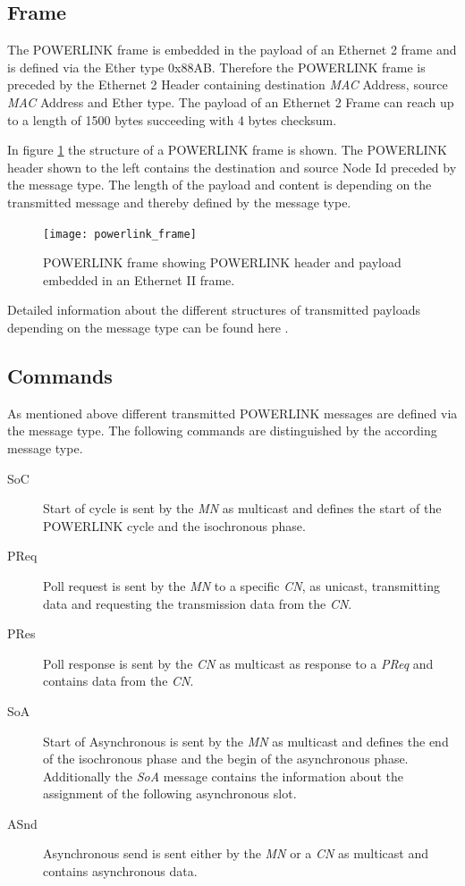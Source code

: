 \subsection{Frame}
\label{sec:oplk_powerlink_frame}
The POWERLINK frame is embedded in the payload of an Ethernet 2 frame and is defined via the Ether type 0x88AB.
Therefore the POWERLINK frame is preceded by the Ethernet 2 Header containing destination \emph{MAC} Address, source \emph{MAC} Address and Ether type.
The payload of an Ethernet 2 Frame can reach up to a length of 1500 bytes succeeding with 4 bytes checksum. \cite[section 3.2]{ethernet_ieee_2016} \cite[section 4.6.1]{epsg_epsg_2013}

In figure \ref{fig:powerlink_frame} the structure of a POWERLINK frame is shown.
The POWERLINK header shown to the left contains the destination and source Node Id preceded by the message type.
The length of the payload and content is depending on the transmitted message and thereby defined by the message type. \cite[section 4.6.1.1]{epsg_epsg_2013}

\begin{figure}
    \centering
    \texttt{[image: powerlink\_frame]}
    \caption{POWERLINK frame showing POWERLINK header and payload embedded in an Ethernet II frame.}
    \label{fig:powerlink_frame}
\end{figure}

Detailed information about the different structures of transmitted payloads depending on the message type can be found here \cite[section 4.6.1.1.1]{epsg_epsg_2013}.

\subsection{Commands}
\label{sec:oplk_powerlink_commands}

As mentioned above different transmitted POWERLINK messages are defined via the message type.
The following commands are distinguished by the according message type.

\begin{description}
    \item[SoC] Start of cycle is sent by the \emph{MN} as multicast and defines the start of the POWERLINK cycle and the isochronous phase.
    \item[PReq] Poll request is sent by the \emph{MN} to a specific \emph{CN}, as unicast, transmitting data and requesting the transmission data from the \emph{CN}.
    \item[PRes] Poll response is sent by the \emph{CN} as multicast as response to a \emph{PReq} and contains data from the \emph{CN}.
    \item[SoA] Start of Asynchronous is sent by the \emph{MN} as multicast and defines the end of the isochronous phase and the begin of the asynchronous phase.
    Additionally the \emph{SoA} message contains the information about the assignment of the following asynchronous slot.
    \item[ASnd] Asynchronous send is sent either by the \emph{MN} or a \emph{CN} as multicast and contains asynchronous data.
\end{description}

